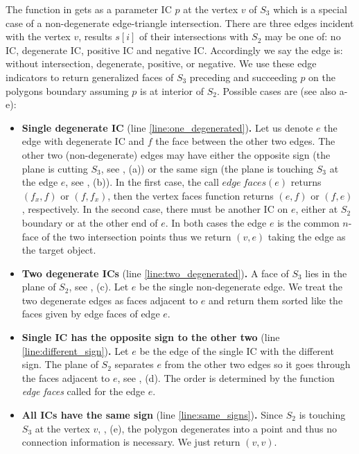 The function in  gets as a parameter IC $p$ at the vertex $v$ of $S_3$ 
which is a special case of a non-degenerate edge-triangle intersection. There are three
edges incident with the vertex $v$, results $s[i]$ of their intersections with $S_2$ may be one of: no IC, 
degenerate IC, positive IC and negative IC. Accordingly we say the edge is: without intersection, degenerate, positive, or negative. 
We use these edge indicators to return generalized faces of $S_3$ preceding and succeeding $p$ on the polygons boundary assuming $p$ is at interior of $S_2$.
Possible cases are (see also  a-e):
\begin{itemize}
 \item {\bf Single degenerate IC} (line \ref{line:one_degenerated}){\bf .} Let us denote $e$ the edge with degenerate IC 
 and $f$ the face between the other two edges.
 The other two (non-degenerate) edges may have either the opposite sign (the plane is cutting $S_3$, see , (a)) 
 or the same sign (the plane is touching $S_3$ at the edge $e$, see , (b)).
 In the first case, the call $edge\ faces(e)$ returns $(f_x,f)$ or $(f,f_x)$, then the vertex faces function returns $(e, f)$ or $(f, e)$, respectively.
 In the second case,  there must be another IC on $e$, either at $S_2$ boundary or at the other end of $e$.
 In both cases the edge $e$ is the common $n$-face of the two intersection points thus we return 
 $(v,e)$ taking the edge as the target object.

 
 \item {\bf Two degenerate ICs} (line \ref{line:two_degenerated}){\bf .} A face of $S_3$ lies in the plane of $S_2$,
 see , (c). 
 Let $e$ be the single non-degenerate edge. We treat the two degenerate edges as faces adjacent to $e$ 
 and return them sorted like the faces given by edge faces of edge $e$.
 
 
 \item {\bf Single IC has the opposite sign to the other two} (line \ref{line:different_sign}){\bf .} 
 Let $e$ be the edge of the single IC with the different sign. 
 The plane of $S_2$ separates $e$ from the other two edges so it goes through the faces adjacent to $e$,
 see , (d).
 The order is determined by the function \emph{edge faces} called for the edge $e$.

 \item {\bf All ICs have the same sign} (line \ref{line:same_signs}){\bf .} Since $S_2$ is touching $S_3$ 
 at the vertex $v$, , (e), the polygon degenerates into a point and thus no connection information is necessary.
 We just return $(v,v)$.
\end{itemize}

